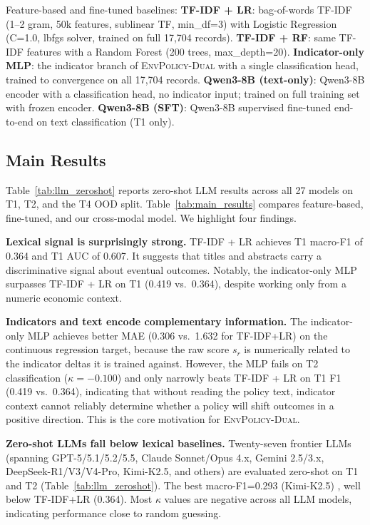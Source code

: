 \documentclass[11pt]{article}
\newcommand{\ours}{\textsc{EnvPolicy-Dual}}
\begin{document}
\noindent Feature-based and fine-tuned baselines:
\textbf{TF-IDF + LR}: bag-of-words TF-IDF (1--2 gram, 50k features, sublinear TF, min\_df=3) with Logistic Regression (C=1.0, lbfgs solver, trained on full 17{,}704 records).
\textbf{TF-IDF + RF}: same TF-IDF features with a Random Forest (200 trees, max\_depth=20).
\textbf{Indicator-only MLP}: the indicator branch of \ours{} with a single classification head, trained to convergence on all 17{,}704 records.
\textbf{Qwen3-8B (text-only)}: Qwen3-8B encoder with a classification head, no indicator input; trained on full training set with frozen encoder.
\textbf{Qwen3-8B (SFT)}: Qwen3-8B supervised fine-tuned end-to-end on text classification (T1 only).

\subsection{Main Results}





Table~\ref{tab:llm_zeroshot} reports zero-shot LLM results across all 27 models
on T1, T2, and the T4 OOD split. Table~\ref{tab:main_results} compares
feature-based, fine-tuned, and our cross-modal model.
We highlight four findings.

\textbf{Lexical signal is surprisingly strong.} TF-IDF + LR achieves T1 macro-F1 of 0.364 and T1 AUC of 0.607. It suggests that titles and abstracts carry a discriminative signal about eventual outcomes. Notably, the indicator-only MLP surpasses TF-IDF + LR on T1 (0.419 vs.\ 0.364), despite working only from a numeric economic context.

\textbf{Indicators and text encode complementary information.} The indicator-only MLP achieves better MAE (0.306 vs.\ 1.632 for TF-IDF+LR) on the continuous regression target, because the raw score $s_r$ is numerically related to the indicator deltas it is trained against. However, the MLP fails on T2 classification ($\kappa=-0.100$) and only narrowly beats TF-IDF + LR on T1 F1 (0.419 vs.\ 0.364), indicating that without reading the policy text, indicator context cannot reliably determine whether a policy will
shift outcomes in a positive direction. This is the core motivation for \ours.


\textbf{Zero-shot LLMs fall below lexical baselines.}
Twenty-seven frontier LLMs (spanning GPT-5/5.1/5.2/5.5, Claude Sonnet/Opus 4.x, Gemini 2.5/3.x, DeepSeek-R1/V3/V4-Pro, Kimi-K2.5, and others) are evaluated zero-shot on T1 and T2 (Table~\ref{tab:llm_zeroshot}). The best macro-F1=0.293 (Kimi-K2.5) , well below TF-IDF+LR (0.364). Most $\kappa$ values are negative across all LLM models, indicating performance close to random guessing.
\end{document}
